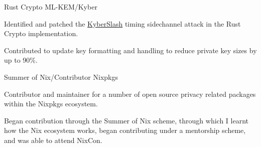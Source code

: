 


\begin{cventries}


\cventry
{Rust Crypto} %
{ML-KEM/Kyber} %
{} %
{} %
{ %
\begin{cvitems}
\vspace{-4mm}
\item {Identified and patched the \href{https://kyberslash.cr.yp.to/}{KyberSlash} timing sidechannel attack in the Rust Crypto implementation.}
\item {Contributed to update key formatting and handling to reduce private key sizes by up to 90\%.}
\vspace{4mm}
\end{cvitems}
}


\cventry
{Summer of Nix/Contributor} %
{Nixpkgs} %
{} %
{} %
{ %
\begin{cvitems}
\vspace{-4mm}
\item {Contributor and maintainer for a number of open source privacy related packages within the Nixpkgs ecosystem.}
\item {Began contribution through the Summer of Nix scheme, through which I learnt how the Nix ecosystem works, began contributing under a mentorship scheme, and was able to attend NixCon.}
\vspace{4mm}
\end{cvitems}
}


\end{cventries}
